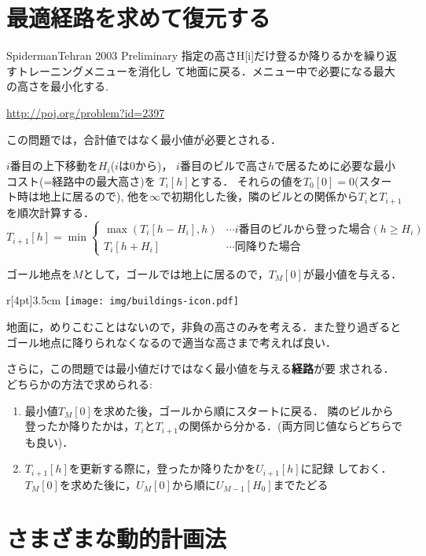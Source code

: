 \section{最適経路を求めて復元する}
\begin{pbox}{Spiderman}{Tehran 2003 Preliminary}
指定の高さH[i]だけ登るか降りるかを繰り返すトレーニングメニューを消化し
て地面に戻る．メニュー中で必要になる最大の高さを最小化する.

\url{http://poj.org/problem?id=2397}
\end{pbox}

この問題では，合計値ではなく最小値が必要とされる．    

$i$番目の上下移動を$H_i$($i$は0から)，
$i$番目のビルで高さ$h$で居るために必要な最小コスト(=経路中の最大高さ)を $T_i[h]$とする．
それらの値を$T_0[0]=0$(スタート時は地上に居るので), 他を$\infty$で初期化した後，隣のビルとの関係から$T_i$と$T_{i+1}$を順次計算する．
$$T_{i+1}[h] = \min\left\{
\begin{array}{ll}
\max(T_i[h-H_i],h)  & \cdots i\mbox{番目のビルから登った場合} (h\ge H_i)\\
 T_i[h+H_i]  & \cdots \mbox{同降りた場合} 
\end{array}\right.
$$

ゴール地点を$M$として，ゴールでは地上に居るので，$T_M[0]$が最小値を与える．

\begin{wrapfigure}[5]{r}[4pt]{3.5cm}
\texttt{[image: img/buildings-icon.pdf]}
\end{wrapfigure}       

地面に，めりこむことはないので，非負の高さのみを考える．また登り過ぎるとゴール地点に降りられなくなるので適当な高さまで考えれば良い．

さらに，この問題では最小値だけではなく最小値を与える\textbf{経路}が要
求される．どちらかの方法で求められる:
\begin{enumerate}
\setlength{\itemsep}{0pt}
\item 最小値$T_M[0]$を求めた後，ゴールから順にスタートに戻る．
隣のビルから登ったか降りたかは，$T_i$と$T_{i+1}$の関係から分かる．(両方同じ値ならどちらでも良い)．
\item $T_{i+1}[h]$を更新する際に，登ったか降りたかを$U_{i+1}[h]$に記録
  しておく．$T_{M}[0]$を求めた後に，$U_{M}[0]$から順に$U_{M-1}[H_0]$までたどる
\end{enumerate}

\section{さまざまな動的計画法}

